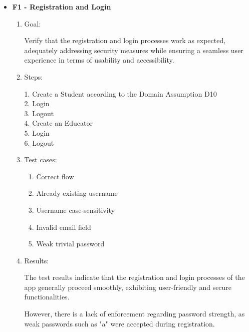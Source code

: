 \documentclass{Configuration_Files/Template}
\begin{document}
\begin{itemize}

    \item \textbf{F1 - Registration and Login}
    
    \begin{enumerate}
    
        \item Goal:
        
        Verify that the registration and login processes work as expected, adequately addressing security measures while ensuring a seamless user experience in terms of usability and accessibility.
        
        \item Steps:
        
            1. Create a Student according to the Domain Assumption D10\\
            2. Login\\
            3. Logout\\
            4. Create an Educator\\
            5. Login\\
            6. Logout
        
        \item Test cases:
        
        \begin{enumerate}
        
            \item Correct flow
            \item Already existing username
            \item Username case-sensitivity
            \item Invalid email field
            \item Weak trivial password
    
        \end{enumerate}
        
        \item Results:
        
        The test results indicate that the registration and login processes of the app generally proceed smoothly, exhibiting user-friendly and secure functionalities.
        
        However, there is a lack of enforcement regarding password strength, as weak passwords such as "a" were accepted during registration.\\
    
    \end{enumerate}
    

\end{itemize}
\end{document}
